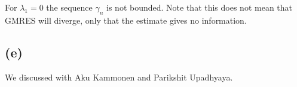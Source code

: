 For $\lambda_{1} = 0$ the sequence $\gamma_{n}$ is not bounded. Note that this does not mean that GMRES will diverge, only that the estimate gives no information.
\subsection*{(e)}
We discussed with Aku Kammonen and Parikshit Upadhyaya.

